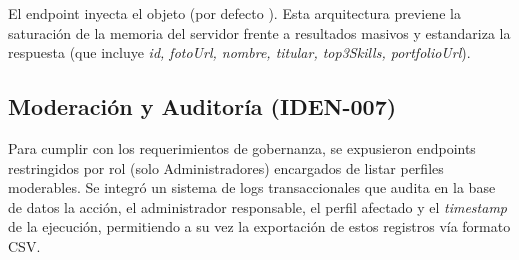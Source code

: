 \begin{NotaTecnica}
El endpoint  inyecta el objeto  (por defecto ). Esta arquitectura previene la saturación de la memoria del servidor frente a resultados masivos y estandariza la respuesta  (que incluye \textit{id, fotoUrl, nombre, titular, top3Skills, portfolioUrl}).
\end{NotaTecnica}

\subsection{Moderación y Auditoría (IDEN-007)}
Para cumplir con los requerimientos de gobernanza, se expusieron endpoints restringidos por rol (solo Administradores) encargados de listar perfiles moderables. Se integró un sistema de logs transaccionales que audita en la base de datos la acción, el administrador responsable, el perfil afectado y el \textit{timestamp} de la ejecución, permitiendo a su vez la exportación de estos registros vía formato CSV.